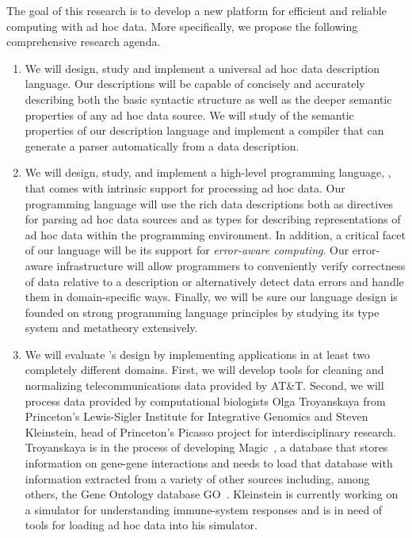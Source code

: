 \documentclass[11pt]{article}
\begin{document}
The goal of this research is to develop a new platform for
efficient and reliable computing with ad hoc data.
More specifically, we propose the following comprehensive 
research agenda.

\begin{enumerate}
\item We will design, study and implement
a universal ad hoc data description language.
Our descriptions will be capable of
concisely and accurately describing both the basic syntactic structure
as well as the deeper semantic properties of any ad hoc data source.
We will study of the semantic properties of our description language
and implement a compiler that can
generate a parser automatically from a data description.

\item We will design, study, and implement a 
high-level programming language, \datatype{}, that comes with 
intrinsic support for 
processing ad hoc data.  Our programming language will use the
rich data descriptions both as directives for
parsing ad hoc data sources and as types for describing
representations of ad hoc data within the programming environment.  
In addition,
a critical facet of our language will be its support for
{\em error-aware computing}.  Our error-aware infrastructure 
will allow programmers to conveniently
verify correctness of data relative to a description or 
alternatively detect data errors and handle them in domain-specific
ways.  Finally, we will be sure
our language design is founded on
strong programming language principles by
studying its type system and metatheory extensively. 

\item We will evaluate \datatype's design by implementing 
applications in at least two completely different domains.  First, we will
develop tools for cleaning and normalizing
telecommunications data provided by AT\&T.  Second, we 
will process data provided by computational biologists
Olga Troyanskaya from Princeton's Lewis-Sigler Institute for 
Integrative Genomics and Steven Kleinstein, head of Princeton's
Picasso project for interdisciplinary research.
Troyanskaya is in the process of developing Magic~\cite{magic}, a database 
that stores information on gene-gene interactions
and needs to load that database with information extracted from
a variety of other sources including, among others,
the Gene Ontology database GO~\cite{go}.  Kleinstein is currently working on
a simulator for understanding immune-system responses and is in need of tools for
loading ad hoc data into his simulator. 
\end{enumerate}
\end{document}
